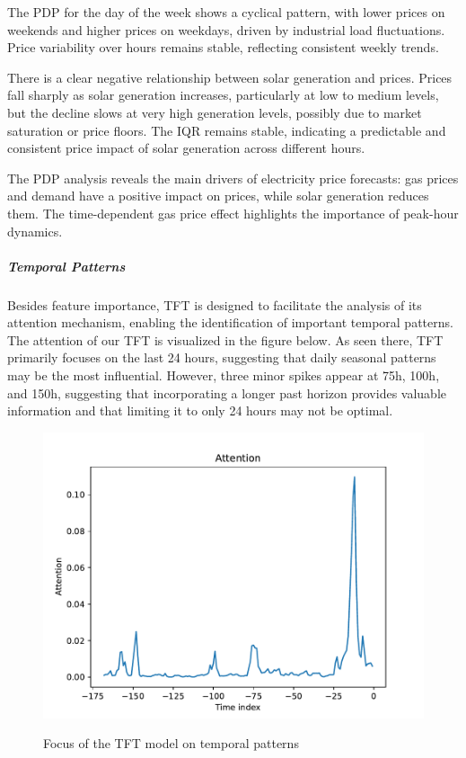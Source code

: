 \documentclass[a4paper]{article}
\begin{document}
The PDP for the day of the week shows a cyclical pattern, with lower
prices on weekends and higher prices on weekdays, driven by industrial
load fluctuations. Price variability over hours remains stable,
reflecting consistent weekly trends.

There is a clear negative relationship between solar generation and
prices. Prices fall sharply as solar generation increases, particularly
at low to medium levels, but the decline slows at very high generation
levels, possibly due to market saturation or price floors. The IQR
remains stable, indicating a predictable and consistent price impact of
solar generation across different hours.

The PDP analysis reveals the main drivers of electricity price
forecasts: gas prices and demand have a positive impact on prices, while
solar generation reduces them. The time-dependent gas price effect
highlights the importance of peak-hour dynamics.

    \subparagraph{Temporal Patterns}\label{temporal-patterns}

Besides feature importance, TFT is designed to facilitate the analysis
of its attention mechanism, enabling the identification of important
temporal patterns. The attention of our TFT is visualized in the figure
below. As seen there, TFT primarily focuses on the last 24 hours,
suggesting that daily seasonal patterns may be the most influential.
However, three minor spikes appear at 75h, 100h, and 150h, suggesting
that incorporating a longer past horizon provides valuable information
and that limiting it to only 24 hours may not be optimal.

    \begin{figure}
\centering
{\includegraphics[keepaspectratio]{"./src/attention.pdf"}}
\caption{Focus of the TFT model on temporal patterns}
\end{figure}
\end{document}
